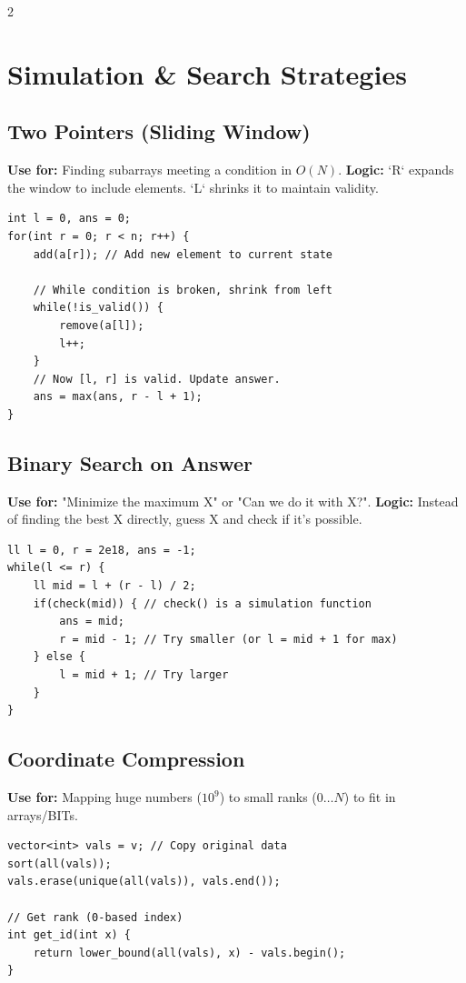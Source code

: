 \documentclass[10pt, letterpaper]{article}
\begin{document}
\begin{multicols}{2}
	\section{Simulation \& Search Strategies}

	\subsection{Two Pointers (Sliding Window)}
	\textbf{Use for:} Finding subarrays meeting a condition in $O(N)$.
	\textbf{Logic:} `R` expands the window to include elements. `L` shrinks it to maintain validity.
	\begin{lstlisting}
int l = 0, ans = 0;
for(int r = 0; r < n; r++) {
    add(a[r]); // Add new element to current state

    // While condition is broken, shrink from left
    while(!is_valid()) {
        remove(a[l]);
        l++;
    }
    // Now [l, r] is valid. Update answer.
    ans = max(ans, r - l + 1);
}
\end{lstlisting}

	\subsection{Binary Search on Answer}
	\textbf{Use for:} "Minimize the maximum X" or "Can we do it with X?".
	\textbf{Logic:} Instead of finding the best X directly, guess X and check if it's possible.
	\begin{lstlisting}
ll l = 0, r = 2e18, ans = -1;
while(l <= r) {
    ll mid = l + (r - l) / 2;
    if(check(mid)) { // check() is a simulation function
        ans = mid;
        r = mid - 1; // Try smaller (or l = mid + 1 for max)
    } else {
        l = mid + 1; // Try larger
    }
}
\end{lstlisting}

	\subsection{Coordinate Compression}
	\textbf{Use for:} Mapping huge numbers ($10^9$) to small ranks ($0 \dots N$) to fit in arrays/BITs.
	\begin{lstlisting}
vector<int> vals = v; // Copy original data
sort(all(vals));
vals.erase(unique(all(vals)), vals.end());

// Get rank (0-based index)
int get_id(int x) {
    return lower_bound(all(vals), x) - vals.begin();
}
\end{lstlisting}


\end{multicols}
\end{document}
